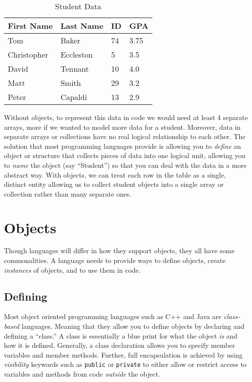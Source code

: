\begin{table}
\centering
\begin{tabular}{|l|l|l|l|}
\hline
First Name & Last Name & ID & GPA \\
\hline\hline
Tom & Baker & 74 & 3.75 \\
\hline
Christopher & Eccleston & 5 & 3.5 \\
\hline
David & Tennant & 10 & 4.0 \\
\hline
Matt & Smith & 29 & 3.2 \\
\hline
Peter & Capaldi & 13 & 2.9 \\
\hline
\end{tabular}
\caption{Student Data}
\label{table:studentData}
\end{table}

Without objects, to represent this data in code we would need at least
4 separate arrays, more if we wanted to model more data for a student.  
Moreover, data in separate arrays or collections have no real logical
relationship to each other.  The solution that most programming languages
provide is allowing you to \emph{define} an object or structure that
collects pieces of data into one logical unit, allowing you to \emph{name}
the object (say ``Student'') so that you can deal with the data in
a more abstract way.  With objects, we can treat each row in the table
as a single, distinct entity allowing us to collect student objects
into a single array or collection rather than many separate ones.

\section{Objects}

Though languages will differ in how they support objects, they all have
some commonalities.  A language needs to provide ways to define objects,
create \emph{instances} of objects, and to use them in code.

\subsection{Defining}

Most object oriented programming languages such as C++ and Java are 
\emph{class-based} languages.  Meaning that they allow you to define
objects by declaring and defining a ``class.''  A class is essentially
a blue print for what the object \emph{is} and how it is defined.  
Generally, a class declaration allows you to specify member variables
and member methods.  Further, full encapsulation is achieved by using
\emph{visibility} keywords such as \texttt{public} or
\texttt{private} to either allow or restrict access to variables
and methods from code \emph{outside} the object.  

